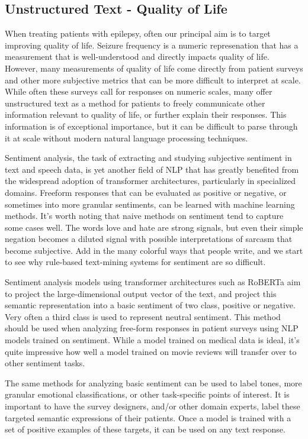\subsection{Unstructured Text - Quality of Life}
When treating patients with epilepsy, often our principal aim is to target improving quality of life. Seizure frequency is a numeric represenation that has a measurement
that is well-understood and directly impacts quality of life. However, many measurements of quality of life come directly from patient surveys and other more subjective
metrics that can be more difficult to interpret at scale. While often these surveys call for responses on numeric scales, many offer unstructured text as a method for
patients to freely communicate other information relevant to quality of life, or further explain their responses. This information is of exceptional importance, but it
can be difficult to parse through it at scale without modern natural language processing techniques.

Sentiment analysis, the task of extracting and studying subjective sentiment in text and speech data, is yet another field of NLP that has greatly benefited from the
widespread adoption of transformer architectures, particularly in specialized domains. Freeform responses that can be evaluated as positive or negative, or sometimes into more
granular sentiments, can be learned with machine learning methods. It's worth noting that naive methods on sentiment tend to capture some cases well. The words love and hate are
strong signals, but even their simple negation becomes a diluted signal with possible interpretations of sarcasm that become subjective. Add in the many colorful ways that people
write, and we start to see why rule-based text-mining systems for sentiment are so difficult.

Sentiment analysis models using transformer architectures such as RoBERTa aim to project the large-dimensional output vector of the text, and project this semantic representation
into a basic sentiment of two class, positive or negative. Very often a third class is used to represent neutral sentiment. This method should be used when analyzing free-form responses
in patient surveys using NLP models trained on sentiment. While a model trained on medical data is ideal, it's quite impressive how well a model trained on movie reviews will transfer
over to other sentiment tasks.

The same methods for analyzing basic sentiment can be used to label tones, more granular emotional classifications, or other task-specific points of interest.
It is important to have the survey designers, and/or other domain experts, label these targeted semantic
expressions of their patients. Once a model is trained with a set of positive examples of these targets, it can be used on any text response.

